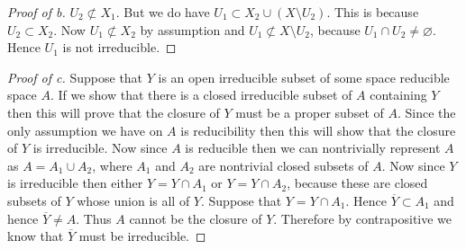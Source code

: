 \documentclass{article}
\begin{document}
\begin{problem}
\begin{proof}[Proof of b]
    $U_2\not\subset X_1$. But we do have $U_1 \subset X_2\cup (X\setminus
    U_2)$. This is because $U_2\subset X_2$. Now $U_1\not\subset X_2$ by
    assumption and $U_1\not\subset X\setminus U_2$, because $U_1\cap
    U_2\ne\varnothing$. Hence $U_1$ is not irreducible.
  \end{proof}
  \begin{proof}[Proof of c]
    Suppose that $Y$ is an open irreducible subset of some space reducible space
    $A$. If we show that there is a closed irreducible subset of $A$
    containing $Y$ then this will prove that the closure of $Y$ must be a
    proper subset of $A$. Since the only assumption we have on $A$ is
    reducibility then this will show that the closure of $Y$ is
    irreducible. Now since $A$ is reducible then we can nontrivially represent 
    $A$ as $A=A_1\cup A_2$, where $A_1$
    and $A_2$ are nontrivial closed subsets of $A$. Now since $Y$ is irreducible
    then either $Y=Y\cap A_1$ or $Y=Y\cap A_2$, because these are closed
    subsets of $Y$ whose union is all of $Y$. Suppose that $Y=Y\cap A_1$.
    Hence $\overline{Y}\subset A_1$ and hence $\overline{Y}\ne A$. Thus $A$
    cannot be the closure of $Y$. Therefore by contrapositive we know that
    $\overline{Y}$ must be irreducible.
  \end{proof}
\end{problem}
\end{document}
